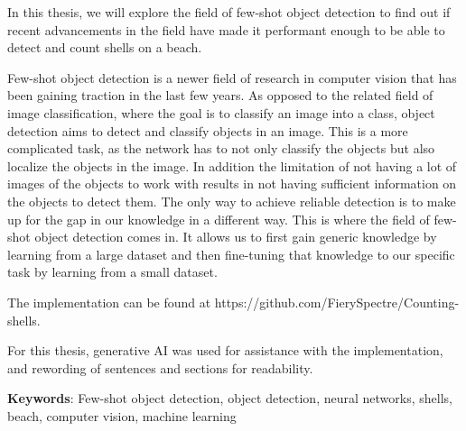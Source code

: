 In this thesis, we will explore the field of few-shot object detection to find out if recent advancements in the field have made it performant enough to be able to detect and count shells on a beach.

Few-shot object detection is a newer field of research in computer vision that has been gaining traction in the last few years. 
As opposed to the related field of image classification, where the goal is to classify an image into a class, object detection aims to detect and classify objects in an image. This is a more complicated task, as the network has to not only classify the objects but also localize the objects in the image. In addition the limitation of not having a lot of images of the objects to work with results in not having sufficient information on the objects to detect them. The only way to achieve reliable detection is to make up for the gap in our knowledge in a different way. This is where the field of few-shot object detection comes in. It allows us to first gain generic knowledge by learning from a large dataset and then fine-tuning that knowledge to our specific task by learning from a small dataset.

The implementation can be found at https://github.com/FierySpectre/Counting-shells.

For this thesis, generative AI was used for assistance with the implementation, and rewording of sentences and sections for readability.

\textbf{Keywords}: Few-shot object detection, object detection, neural networks, shells, beach, computer vision, machine learning